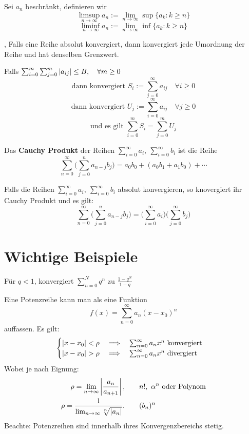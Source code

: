  Sei $a_n$ beschränkt, definieren wir
$$\limsup\limits_{n \rightarrow \infty} a_n := \lim \limits_{n \rightarrow \infty} \sup \{a_k : k\geqslant n\}$$
$$\liminf\limits_{n \rightarrow \infty} a_n := \lim \limits_{n \rightarrow \infty} \inf \{a_k : k\geqslant n\}$$

\sep
\Satz[Umordnung] Falls eine Reihe absolut konvergiert, dann konvergiert jede
Umordnung der Reihe und hat denselben Grenzwert.

\Satz[2.7.23] Falls $\sum_{i=0}^{m}\sum_{j=0}^{m}\left\lvert a_{ij} \right\rvert \leq B, \quad \forall m \geq 0$
\[ \text{dann konvergiert } S_{i} := \sum_{j=0}^{\infty} a_{ij} \quad \forall i \geq 0 \]
\[ \text{dann konvergiert } U_{j} := \sum_{i=0}^{\infty} a_{ij} \quad \forall j \geq 0 \]
\[ \text{und es gilt } \sum_{i=0}^{m} S_{i} = \sum_{j=0}^{m} U_{j} \]

\Satz[2.7.24] Das \textbf{Cauchy Produkt} der Reihen $\sum_{i=0}^{\infty} a_i, \ \sum_{i=0}^{\infty} b_i$ ist die Reihe
\[\sum_{n=0}^\infty \Bigg(\sum_{j=0}^{n} a_{n-j} b_{j} \Bigg) = a_0 b_0 + (a_0 b_1 + a_1 b_0) + \cdots  \]

\Satz[2.7.26] Falls die Reihen $\sum_{i=0}^{\infty} a_i, \ \sum_{i=0}^{\infty} b_i$ absolut konvergieren, so knovergiert ihr Cauchy Produkt und es gilt:
\[\sum_{n=0}^\infty \Bigg(\sum_{j=0}^{n} a_{n-j} b_{j} \Bigg) = \Bigg( \sum_{i=0}^\infty a_i \Bigg) \Bigg(\sum_{j=0}^\infty b_j \Bigg) \]



\section{Wichtige Beispiele}
 Für $q<1$, konvergiert $\sum_{n=0}^N q^n$ zu $\frac{1-q^N}{1-q}$

\Bsp[Potenzreihe] Eine Potenzreihe kann man als eine Funktion 
\[
f(x)=\sum_{n=0}^\infty a_n
(x-x_0)^n
\]
auffassen. Es gilt:
\[
\begin{cases}
\left\lvert x-x_0 \right\rvert< \rho \quad \Longrightarrow \quad \sum_{n=0}^\infty a_nx^n \text{
konvergiert}\\
\left\lvert x-x_0 \right\rvert> \rho \quad \Longrightarrow \quad \sum_{n=0}^\infty a_nx^n \text{
divergiert}\\
\end{cases}
\]
Wobei je nach Eignung: 
\begin{align*}
\rho = \lim_{n\to\infty} \abs{\frac{a_n}{a_{n+1}}}, &\qquad n!, \ \alpha^{n}
\text{ oder Polynom}\\
\rho = \frac{1}{\lim_{n\to\infty}\sqrt[n]{\abs{a_n}}}. &\qquad(b_n)^n
\end{align*}
Beachte: Potenzreihen sind innerhalb ihres Konvergenzbereichs stetig.



